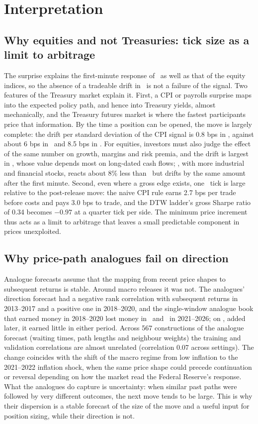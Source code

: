 \section{Interpretation}\label{sec:mechanisms}

\subsection{Why equities and not Treasuries: tick size as a limit to arbitrage}

The surprise explains the first-minute response of \ZN\ as well as that of the equity indices, so
the absence of a tradeable drift in \ZN\ is not a failure of the signal. Two features of the
Treasury market explain it. First, a CPI or payrolls surprise maps into the expected policy path,
and hence into Treasury yields, almost mechanically, and the Treasury futures market is where the
fastest participants price that information. By the time a position can be opened, the move is
largely complete: the drift per standard deviation of the CPI signal is 0.8 bps in \ZN, against
about 6 bps in \ES\ and 8.5 bps in \NQ. For equities, investors must also judge the effect of the same number on
growth, margins and risk premia, and the drift is largest in \NQ, whose value depends most on
long-dated cash flows; \YM, with more industrial and financial stocks, reacts about 8\% less than
\ES\ but drifts by the same amount after the first minute. Second, even where a gross edge exists, one \ZN\ tick is large relative to
the post-release move: the naive CPI rule earns 2.7 bps per trade before costs and pays 3.0 bps to
trade, and the DTW ladder's gross Sharpe ratio of 0.34 becomes $-0.97$ at a quarter tick per side.
The minimum price increment thus acts as a limit to arbitrage that leaves a small predictable
component in prices unexploited.

\subsection{Why price-path analogues fail on direction}

Analogue forecasts assume that the mapping from recent price shapes to subsequent returns is
stable. Around macro releases it was not. The analogues' direction forecast had a negative rank
correlation with subsequent returns in 2013--2017 and a positive one in 2018--2020, and the
single-window analogue book that earned money in 2018--2020 lost money in \ES\ and \NQ\ in
2021--2026; on \YM, added later, it earned little in either period. Across 567 constructions of the analogue forecast (waiting times, path
lengths and neighbour weights) the training and validation correlations are almost unrelated
(correlation 0.07 across settings). The change coincides with the shift of the macro regime from
low inflation to the 2021--2022 inflation shock, when the same price shape could precede
continuation or reversal depending on how the market read the Federal Reserve's response. What the
analogues do capture is uncertainty: when similar past paths were followed by very different
outcomes, the next move tends to be large. This is why their dispersion is a stable forecast of
the size of the move and a useful input for position sizing, while their direction is not.

